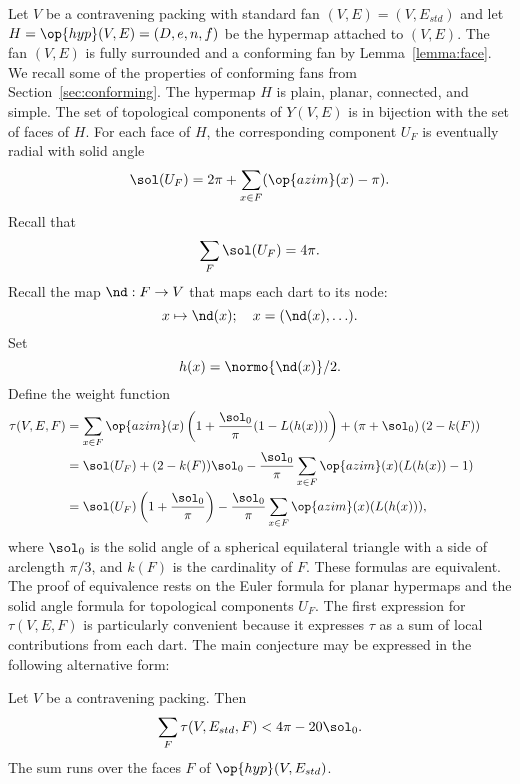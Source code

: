 Let $V$ be a contravening packing with standard fan
$(V,E)=(V,E_{std})$ and let $H=\op{hyp}(V,E)=(D,e,n,f)$ be the
hypermap attached to $(V,E)$.  The fan $(V,E)$ is fully surrounded and
a conforming fan by Lemma~\ref{lemma:face}.  We recall some of the
properties of conforming fans from Section~\ref{sec:conforming}.  The
hypermap $H$ is plain, planar, connected, and simple.  The set of
topological components of $Y(V,E)$ is in bijection with the set of
faces of $H$.  %
For each face of $H$, the corresponding component $U_F$ is eventually
radial with solid angle 
%
%
 
\[ 
\sol(U_F) = 2\pi + \sum_{x\in F} (\op{azim}(x) -\pi).
\] 
Recall that
\[ \sum_{F} \sol(U_F) = 4\pi.\] 
Recall the map $\nd:F\to V$ that maps each dart to its node:
\[ 
x \mapsto \nd(x); \quad   x = (\nd(x),\ldots).
\] 
Set 
\[ h(x) = \normo{\nd(x)}/2.\] 
Define the weight function
\begin{align}
  \tau(V,E,F) &=\sum_{x\in F} \op{azim}(x)
  \left(1 + \dfrac{\sol_0}{\pi}(1- L(h(x)))\right) 
  + \left(\pi+{\sol_0}\right) (2- k(F))\qquad\phantom{t}\vspace{6pt}\nonumber\\
  &= \sol(U_F) + (2- k(F))\sol_0 - \dfrac{\sol_0}{\pi}
\sum_{x\in F}\op{azim}(x) (L(h(x)) - 1)\vspace{6pt}\nonumber\\
  &= \sol(U_F) \left( 1 + \dfrac{\sol_0}{\pi}\right) 
- \dfrac{\sol_0}{\pi} \sum_{x\in F} \op{azim}(x)(L(h(x))),\label{eqn:tau-sol}
\end{align}
where $\sol_0$ is the solid angle of a spherical equilateral triangle with a side of arclength $\pi/3$, and $k(F)$ is the cardinality of $F$.
% 
These formulas are equivalent.  The proof of equivalence rests on the
Euler formula for planar hypermaps and the solid angle formula for
topological components $U_F$.  The first expression for $\tau(V,E,F)$
is particularly convenient because it expresses $\tau$ as a sum of
local contributions from each dart.  %
%
%
The main conjecture may be expressed in the following alternative
form:

\begin{lemma}[target]\label{lemma:4pi-sol}
Let $V$ be a contravening packing. %
Then
\[ 
\sum_F \tau (V,E_{std},F) < 4\pi - 20\sol_0.
\] 
The sum runs over the faces $F$ of $\op{hyp}(V,E_{std})$.
\end{lemma}

